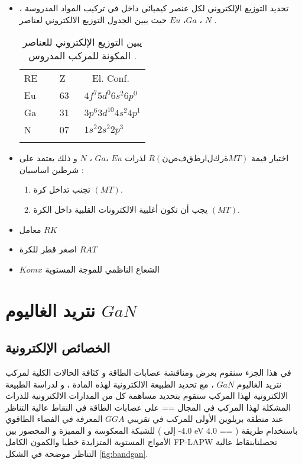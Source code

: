 \begin{itemize}
	\item 
	تحديد التوزيع الإلكتروني لكل عنصر كيميائي داخل في تركيب المواد المدروسة ، حيث يبين الجدول  التوزيع الالكتروني لعناصر $ Eu $  ،$ Ga $ ، $ N $ .
	
	\begin{table}
		\centering
		\begin{tabular}{lll}
			\hline\noalign{\smallskip}
			RE &~~ Z~~ &~ El. Conf. \\
			\noalign{\smallskip}\hline\noalign{\smallskip}
			Eu &~~ 63~ & $ 4f^{7} 5d^{0} 6s^{2} 6p^{0} $ \\
			Ga &~~ 31~ & $ 3p^{6} 3d^{10} 4s^{2} 4p^{1}  $  \\
			N &~~ 07~ & $ 1s^{2} 2s^{2} 2p^{3} $\\
			\noalign{\smallskip}\hline
		\end{tabular}
		\caption{ يبين التوزيع الإلكتروني للعناصر المكونة للمركب المدروس .  }
		\label{tab:1}
	\end{table}

		\item 

		 اختيار قيمة $  R (نصف قطر الكرة MT) $ لذرات $ Eu $  ،$ Ga $ ، $ N $  و ذلك يعتمد على شرطين اساسیان :
		\begin{enumerate}
			\item 
			تجنب تداخل كرة $ (MT) $.
			\item 
			يجب أن تكون أغلبية الالكترونات القلبية داخل الكرة $ (MT) $.

		\end{enumerate}
		
			\item 
			معامل $ RK $ 
				\item 
				اصغر قطر للكرة $ RAT $
				\item
				 $ Komx $ الشعاع الناظمي للموجة المستوية
\end{itemize}


\section{ نتريد الغاليوم $ GaN $}
\subsection{الخصائص الإلكترونية }

في هذا الجزء سنقوم بعرض ومناقشة عصابات الطاقة و كثافة الحالات الكلية لمركب نتريد الغاليوم $ GaN $ ، مع تحديد الطبيعة الالكترونية لهذه المادة ، و لدراسة الطبيعة الالكترونية لهذا المركب سنقوم بتحديد مساهمة كل من المدارات الالكترونية للذرات المشكلة لهذا المركب في المجال == على عصابات الطاقة في النقاط عالية التناظر عند منطقة بريلوين الأولى للمركب في تقريبي $ GGA $ المعرفة في الفضاء الطاقوي للشبكة المعكوسة و المميزة و المحصور بين ( 4.0- إلى eV 4.0 == ) 
باستخدام طريقة الأمواج المستوية المتزايدة خطيا والكمون الكامل FP-LAPW تحصلنابنقاط عالية التناظر موضحة في الشكل \ref{fig:bandgan}.


